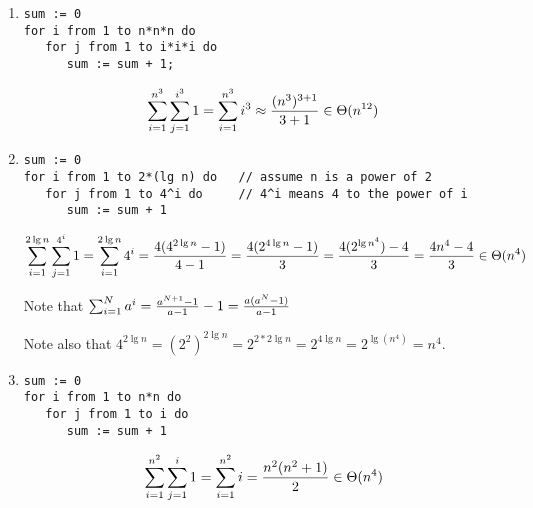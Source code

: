 \begin{enumerate}

\item
\begin{verbatim}
sum := 0
for i from 1 to n*n*n do
   for j from 1 to i*i*i do
      sum := sum + 1;
\end{verbatim}

  \begin{spaceForAnswer}
    \answerbox
  \end{spaceForAnswer}

\begin{solution}
$$\sum_{i=1}^{n^3} \sum_{j=1}^{i^3} 1
= \sum_{i=1}^{n^3} i^3
\approx { (n^3)^{3+1} \over 3+1 }
\in \Theta(n^{12})$$
\end{solution}

\item
\begin{verbatim}
sum := 0
for i from 1 to 2*(lg n) do   // assume n is a power of 2
   for j from 1 to 4^i do     // 4^i means 4 to the power of i
      sum := sum + 1
\end{verbatim}

  \begin{spaceForAnswer}
    \answerbox
  \end{spaceForAnswer}
\begin{solution}
$$\sum_{i=1}^{2\lg n} \sum_{j=1}^{4^i} 1
= \sum_{i=1}^{2\lg n} 4^i
= {  4(4^{2\lg n} - 1)  \over  4-1 }
= {  4(2^{4\lg n} - 1)  \over 3}
= {  4(2^{\lg n^4}) - 4 \over 3}
= {  4n^4 - 4 \over 3}
\in \Theta(n^4)$$

Note that $\sum_{i=1}^{N} a^i = {a^{N+1} - 1 \over a-1} - 1 = { a(a^N -1) \over a-1}$

Note also that
$4^{2\lg n}
= (2^2)^{2\lg n}
= 2^{2*2\lg n}
= 2^{4\lg n}
= 2^{\lg( n^4 ) }
= n^4$.

\end{solution}

\item
\begin{verbatim}
sum := 0
for i from 1 to n*n do
   for j from 1 to i do
      sum := sum + 1
\end{verbatim}

  \begin{spaceForAnswer}
    \answerbox
  \end{spaceForAnswer}
\begin{solution}
$$\sum_{i=1}^{n^2} \sum_{j=1}^i 1 = \sum_{i=1}^{n^2} i = {n^2(n^2 + 1) \over 2} \in
\Theta(n^4)$$
\end{solution}


\end{enumerate}
